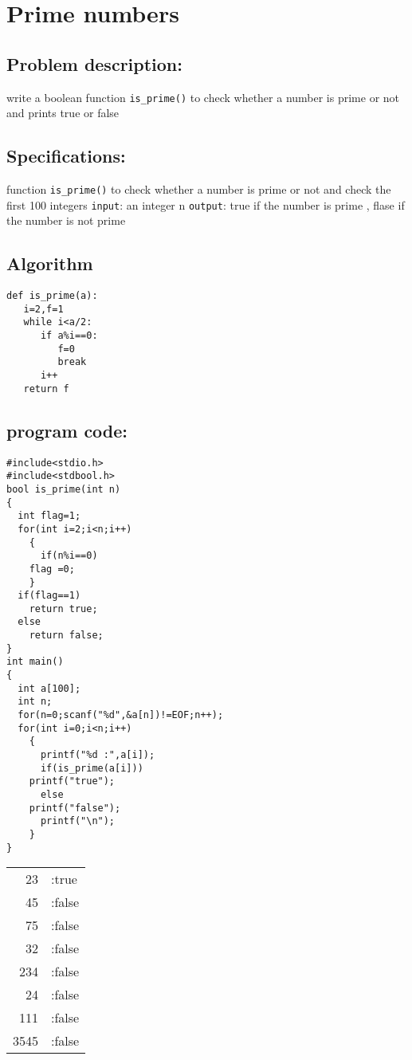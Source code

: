 \documentclass[11pt]{article}
\begin{document}
\section{Prime numbers}
\label{sec-5}

\subsection*{Problem description:}
\label{sec-5-1}
write a boolean function \texttt{is\_prime()} to check whether a number is prime or not 
and prints true or false

\subsection*{Specifications:}
\label{sec-5-2}
function \texttt{is\_prime()} to check whether a number is prime or not 
and check the first 100 integers
\texttt{input}: an integer n
\texttt{output}: true if the number is prime , 
          flase if the number is not prime

\subsection*{Algorithm}
\label{sec-5-3}
\begin{verbatim}
def is_prime(a):
   i=2,f=1
   while i<a/2:
      if a%i==0:
         f=0
         break
      i++
   return f
\end{verbatim}
\subsection*{program code:}
\label{sec-5-4}

\begin{verbatim}
#include<stdio.h>
#include<stdbool.h>
bool is_prime(int n)
{
  int flag=1;
  for(int i=2;i<n;i++)
    {
      if(n%i==0)
	flag =0;
    }
  if(flag==1)
    return true;
  else
    return false;
}
int main()
{
  int a[100];
  int n;
  for(n=0;scanf("%d",&a[n])!=EOF;n++);
  for(int i=0;i<n;i++)
    {
      printf("%d :",a[i]);
      if(is_prime(a[i]))
	printf("true");
      else
	printf("false");
      printf("\n");
    }
}
\end{verbatim}

\begin{center}
\begin{tabular}{rl}
23 & :true\\
45 & :false\\
75 & :false\\
32 & :false\\
234 & :false\\
24 & :false\\
111 & :false\\
3545 & :false\\
\end{tabular}
\end{center}
\end{document}
